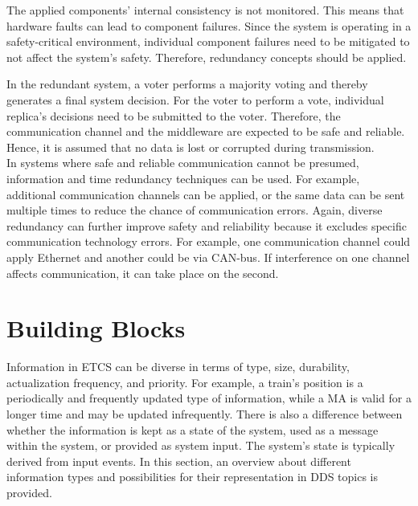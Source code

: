 The applied components' internal consistency is not monitored.
This means that hardware faults can lead to component failures.
Since the system is operating in a safety-critical environment, individual component failures need to be mitigated to not affect the system's safety.
Therefore, redundancy concepts should be applied.

In the redundant system, a voter performs a majority voting and thereby generates a final system decision.
For the voter to perform a vote, individual replica's decisions need to be submitted to the voter.
Therefore, the communication channel and the  middleware are expected to be safe and reliable.
Hence, it is assumed that no data is lost or corrupted during transmission.
\\

In systems where safe and reliable communication cannot be presumed, information and time redundancy techniques can be used.
For example, additional communication channels can be applied, or the same data can be sent multiple times to reduce the chance of communication errors.
Again, diverse redundancy can further improve safety and reliability because it excludes specific communication technology errors.
For example, one communication channel could apply Ethernet and another could be via CAN-bus.
If interference on one channel affects communication, it can take place on the second.


\section{ Building Blocks}

Information in \gls*{ETCS} can be diverse in terms of type, size, durability, actualization frequency, and priority.
For example, a train's position is a periodically and frequently updated type of information, while a \gls*{MA} is valid for a longer time and may be updated infrequently.
There is also a difference between whether the information is kept as a state of the system, used as a message within the system, or provided as system input.
The system's state is typically derived from input events.
In this section, an overview about different information types and possibilities for their representation in \gls*{DDS} topics is provided.


